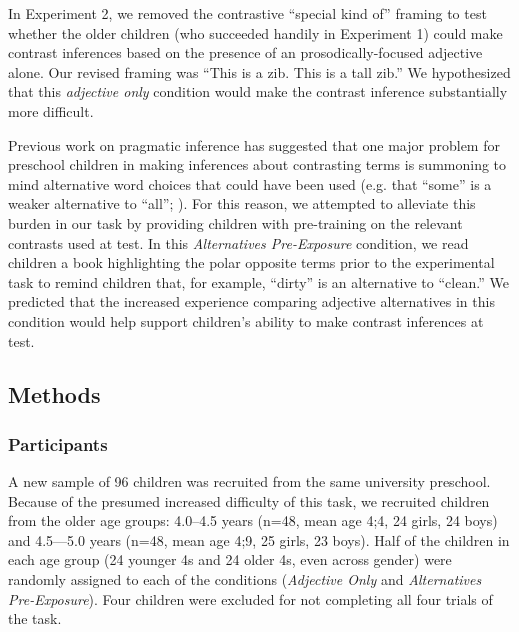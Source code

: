 \documentclass[man]{apa2}
\begin{document}

In Experiment 2, we removed the contrastive ``special kind of'' framing to test whether the older children (who succeeded handily in Experiment 1) could make contrast inferences based on the presence of an prosodically-focused adjective alone. Our revised framing was ``This is a zib. This is a tall zib.'' We hypothesized that this \emph{adjective only} condition would make the contrast inference substantially more difficult. 

Previous work on pragmatic inference has suggested that one major problem for preschool children in making inferences about contrasting terms is summoning to mind alternative word choices that could have been used (e.g. that ``some'' is a weaker alternative to ``all''; ). For this reason, we attempted to alleviate this burden in our task by providing children with pre-training on the relevant contrasts used at test. In this \emph{Alternatives Pre-Exposure} condition, we read children a book highlighting the polar opposite terms prior to the experimental task to remind children that, for example, ``dirty'' is an alternative to ``clean.'' We predicted that the increased experience comparing adjective alternatives in this condition would help support children's ability to make contrast inferences at test.


\subsection{Methods}

\subsubsection{Participants}

A new sample of 96 children was recruited from the same university preschool.  Because of the presumed increased difficulty of this task, we recruited children from the older age groups: 4.0--4.5 years (n=48, mean age 4;4, 24 girls, 24 boys) and 4.5---5.0 years (n=48, mean age 4;9, 25 girls, 23 boys).  Half of the children in each age group (24 younger 4s and 24 older 4s, even across gender) were randomly assigned to each of the conditions (\emph{Adjective Only} and \emph{Alternatives Pre-Exposure}). Four children were excluded for not completing all four trials of the task. 
\end{document}
